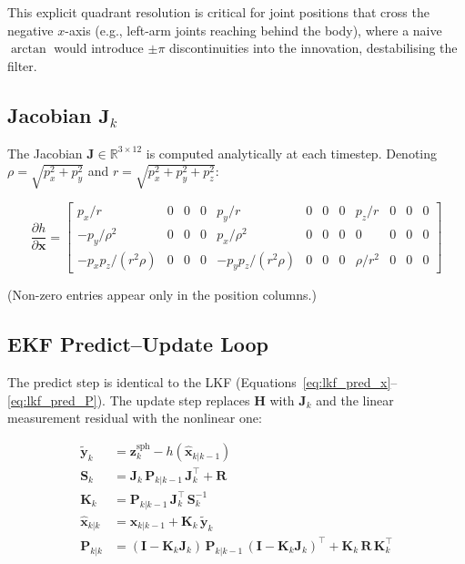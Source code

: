 \documentclass[12pt, a4paper]{article}
\begin{document}
This explicit quadrant resolution is critical for joint positions that cross the negative $x$-axis (e.g., left-arm joints reaching behind the body), where a naive $\arctan$ would introduce $\pm\pi$ discontinuities into the innovation, destabilising the filter.

\subsection{Jacobian \texorpdfstring{$\mathbf{J}_k$}{J\_k}}

The Jacobian $\mathbf{J} \in \mathbb{R}^{3\times12}$ is computed analytically at each timestep. Denoting $\rho = \sqrt{p_x^2+p_y^2}$ and $r = \sqrt{p_x^2+p_y^2+p_z^2}$:

\begin{equation}
\frac{\partial h}{\partial \mathbf{x}} = \begin{bmatrix}
p_x/r              & 0 & 0 & 0 &   p_y/r              & 0 & 0 & 0 &   p_z/r              & 0 & 0 & 0 \\
-p_y/\rho^2        & 0 & 0 & 0 &   p_x/\rho^2         & 0 & 0 & 0 &   0                  & 0 & 0 & 0 \\
-p_x p_z/(r^2\rho) & 0 & 0 & 0 &  -p_y p_z/(r^2\rho)  & 0 & 0 & 0 &   \rho/r^2           & 0 & 0 & 0
\end{bmatrix}
\label{eq:J}
\end{equation}

(Non-zero entries appear only in the position columns.)

\subsection{EKF Predict–Update Loop}

The predict step is identical to the LKF (Equations~\ref{eq:lkf_pred_x}--\ref{eq:lkf_pred_P}). The update step replaces $\mathbf{H}$ with $\mathbf{J}_k$ and the linear measurement residual with the nonlinear one:

\begin{align}
\tilde{\mathbf{y}}_k &= \mathbf{z}_k^{\text{sph}} - h(\hat{\mathbf{x}}_{k|k-1}) \label{eq:ekf_innov} \\
\mathbf{S}_k         &= \mathbf{J}_k\,\mathbf{P}_{k|k-1}\,\mathbf{J}_k^\top + \mathbf{R} \label{eq:ekf_S} \\
\mathbf{K}_k         &= \mathbf{P}_{k|k-1}\,\mathbf{J}_k^\top\,\mathbf{S}_k^{-1} \label{eq:ekf_K} \\
\hat{\mathbf{x}}_{k|k} &= \hat{\mathbf{x}}_{k|k-1} + \mathbf{K}_k\,\tilde{\mathbf{y}}_k \label{eq:ekf_upd} \\
\mathbf{P}_{k|k}     &= (\mathbf{I}-\mathbf{K}_k\mathbf{J}_k)\,\mathbf{P}_{k|k-1}\,(\mathbf{I}-\mathbf{K}_k\mathbf{J}_k)^\top + \mathbf{K}_k\,\mathbf{R}\,\mathbf{K}_k^\top \label{eq:ekf_joseph}
\end{align}
\end{document}
